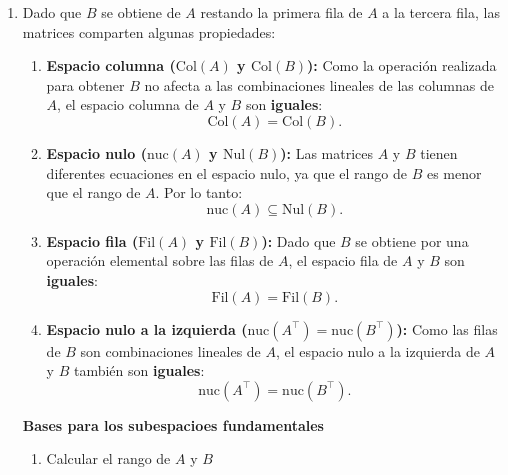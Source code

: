 \begin{enumerate}[label=\color{red}\textbf{\arabic*)}]
    \item {}

        Dado que $B$ se obtiene de $A$ restando la primera fila de $A$ a la tercera fila, las matrices comparten algunas propiedades:
        \begin{enumerate}[label=\arabic*)]
            \item \textbf{Espacio columna ($\mathrm{Col}(A)$ y $\mathrm{Col}(B)$):} Como la operación realizada para obtener $B$ no afecta a  las combinaciones lineales de las columnas de $A$, el espacio columna de  $A$ y $B$ son \textbf{iguales}: \[
            \mathrm{Col}(A)=\mathrm{Col}(B).
            \]  
        \item \textbf{Espacio nulo ($\mathrm{nuc}(A)$ y $\mathrm{Nul}(B)$):} Las matrices $A$ y $B$ tienen diferentes ecuaciones en el espacio nulo, ya que el rango de $B$ es menor que el rango de $A$. Por lo tanto: \[
        \mathrm{nuc}(A)\subseteq \mathrm{Nul}(B).
        \]  
    \item \textbf{Espacio fila ($\mathrm{Fil}(A)$ y $\mathrm{Fil}(B)$):} Dado que $B$ se obtiene por una operación elemental sobre las filas de $A$, el espacio fila de $A$ y $B$ son \textbf{iguales}: \[
    \mathrm{Fil}(A)=\mathrm{Fil}(B).
    \]   
\item \textbf{Espacio nulo a la izquierda ($\mathrm{nuc}(A^\intercal)=\mathrm{nuc}(B^\intercal)$):} Como las filas de $B$ son combinaciones lineales de $A$, el espacio nulo a la izquierda de $A$ y $B$ también son \textbf{iguales}: \[
\mathrm{nuc}(A^\intercal)=\mathrm{nuc}(B^\intercal).
\]   
        \end{enumerate}
        \textbf{Bases para los subespacioes fundamentales}
        \begin{enumerate}[label=Paso \arabic*:]
            \item Calcular el rango de $A$ y $B$


\end{enumerate}
\end{enumerate}
